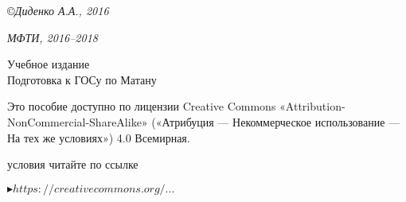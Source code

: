 \medskip
\small
\copyright \textsl{Диденко А.А., 2016}

\medspace

\textsl{МФТИ, 2016--2018}

\vspace*{7\baselineskip}

\center

{\Large Учебное издание}
\\[2\baselineskip]
{\Huge Подготовка к ГОСу по Матану}

\vspace*{\fill}

\noindent
\begin{minipage}[t]{0.61\textwidth}
\quad\small Это пособие доступно по лицензии Creative Commons «Attribution-NonCommercial-ShareAlike» («Атрибуция — Некоммерческое использование — На тех же условиях») 4.0 Всемирная.

 условия читайте по ссылке

\qquad\href{https://creativecommons.org/licenses/by-nc-sa/4.0/deed.ru}{\textcolor{prpl}{$\blacktriangleright https://creativecommons.org/...$}}
\end{minipage}%
\hfill%
\begin{minipage}[t]{\dimexpr(0.39\textwidth-2mm)}
\end{minipage}
